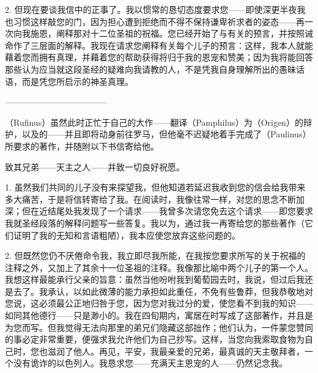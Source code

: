 2. 但现在要谈我信中的正事了。我以惯常的恳切态度要求您——即使深更半夜我也习惯这样敲您的门，因为担心遭到拒绝而不得不保持谦卑祈求者的姿态——再一次向我施恩，阐释那对十二位圣祖的祝福。您已经开始了与有关的预言，并按照诫命作了三层面的解释。我现在请求您阐释有关每个儿子的预言：这样，我本人就能藉着您而拥有真理，并藉着您的帮助获得将归于我的恩宠和赞美；因为我将能回答那些认为应当就这段圣经的疑难向我请教的人，不是凭我自身理解所出的愚昧话语，而是凭您所启示的神圣真理。\par

————————————\par

（Rufinus）虽然此时正忙于自己的大作——翻译（Pamphilus）为（Origen）的辩护，以及的——并且即将动身前往罗马，但他毫不迟疑地着手完成了（Paulinus）所要求的著作，并随附以下书信寄给他。\par

致其兄弟——天主之人——并致一切良好祝愿。\par

1. 虽然我们共同的儿子没有来探望我，但他知道若延迟我收到您的信会给我带来多大痛苦，于是将信转寄给了我。在阅读时，我像往常一样，对您的思念不断加深；但在近结尾处我发现了一个请求——我曾多次请您免去这个请求——即您要求我就圣经段落的解释问题写一些答复。我以为，通过我一再寄给您的那些著作（它们证明了我的无知和言语粗陋），我本应使您放弃这些问题的。\par

2. 但既然您仍不厌倦命令我，我立即尽我所能，在我按您要求所写的关于祝福的注释之外，又加上了其余十一位圣祖的注释。我像那比喻中两个儿子的第一个人。我想这样最能承行父亲的旨意：虽然当他吩咐我到葡萄园去时，我说，但过后我还是去了。我承认，以如此微薄的能力承担如此重任，不免有些鲁莽，但我恭敬地对您说，这必须最公正地归咎于您，因为您对我过分的爱，使您看不到我的知识——如同其他德行——只是渺小的。我在四旬期内，寓居在时写成了这部著作，并且是为您而写。但我觉得无法向那里的弟兄们隐藏这部拙作；他们认为，一件蒙您赞同的事必定非常重要，便强求我允许他们为自己抄写。这样，当您向我索取食物为自己时，您也滋润了他人。再见，平安，我最亲爱的兄弟，最真诚的天主敬拜者，一个没有诡诈的以色列人。我恳求您——充满天主恩宠的人——仍然记念我。\par



